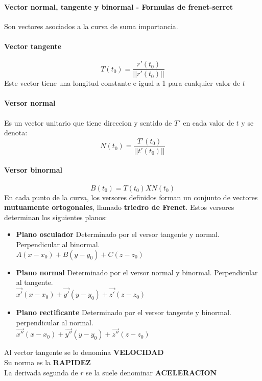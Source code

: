\documentclass[11pt]{article}
\begin{document}
\paragraph{Vector normal, tangente y binormal - Formulas de frenet-serret}
Son vectores asociados a la curva de suma importancia.\\
\paragraph{Vector tangente}
\begin{equation*}
	T(t_0) = \dfrac{r'(t_0)}{||r'(t_0)||}
\end{equation*}
Este vector tiene una longitud constante e igual a 1 para cualquier valor de $t$
\paragraph{Versor normal}
Es un vector unitario que tiene direccion y sentido de $T'$ en cada valor de $t$ y se denota:
\begin{equation*}
	N(t_0) = \dfrac{T'(t_0)}{||t'(t_0)||}
\end{equation*}
\paragraph{Versor binormal}
\begin{equation*}
	B(t_0) = T(t_0) X N(t_0)
\end{equation*}
En cada punto de la curva, los versores definidos forman un conjunto de vectores \textbf{mutuamente ortogonales}, llamado \textbf{triedro de Frenet}. Estos versores determinan los siguientes planos:
\begin{itemize}
	\item \textbf{Plano osculador} Determinado por el versor tangente y normal. Perpendicular al binormal.\\
	$A(x-x_0)+B(y-y_0)+C(z-z_0)$
	\item \textbf{Plano normal} Determinado por el versor normal y binormal. Perpendicular al tangente.\\
	$\overrightarrow{x'}(x-x_0)+\overrightarrow{y'}(y-y_0)+\overrightarrow{z'}(z-z_0)$
	\item \textbf{Plano rectificante} Determinado por el versor tangente y binormal. perpendicular al normal.\\
	$\overrightarrow{x''}(x-x_0)+\overrightarrow{y''}(y-y_0)+\overrightarrow{z''}(z-z_0)$
\end{itemize}
Al vector tangente se lo denomina \textbf{VELOCIDAD}\\
Su norma es la \textbf{RAPIDEZ}\\
La derivada segunda de $r$ se la suele denominar \textbf{ACELERACION}\\
\end{document}

